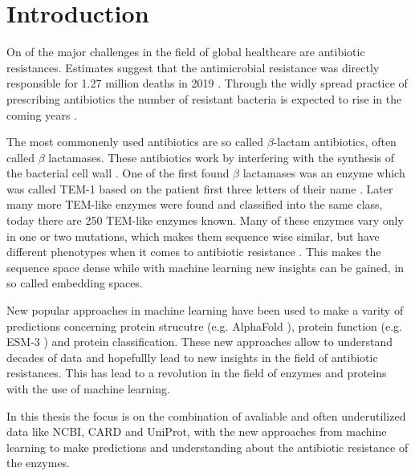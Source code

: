 \chapter{Introduction}

On of the major challenges in the field of global healthcare are antibiotic resistances. Estimates suggest that the antimicrobial resistance was directly responsible for 1.27 million deaths in 2019 \cite{who_antibiotic_resistance}. Through the widly spread practice of prescribing antibiotics the number of resistant bacteria is expected to rise in the coming years \cite{versporten2018}.

The most commonenly used antibiotics are so called $\beta$-lactam antibiotics, often called $\beta$ lactamases. These antibiotics work by interfering with the synthesis of the bacterial cell wall \cite{waxman1980}. One of the first found $\beta$ lactamases was an enzyme which was called TEM-1 based on the patient first three letters of their name \cite{sutcliffe1978}. Later many more TEM-like enzymes were found and classified into the same class, today there are 250 TEM-like enzymes known. Many of these enzymes vary only in one or two mutations, which makes them sequence wise similar, but have different phenotypes when it comes to antibiotic resistance \cite{naas2017}. This makes the sequence space dense while with machine learning new insights can be gained, in so called embedding spaces.

New popular approaches in machine learning have been used to make a varity of predictions concerning protein strucutre (e.g. AlphaFold \cite{jumper2021}), protein function (e.g. ESM-3 \cite{hayes2025}) and protein classification. These new approaches allow to understand decades of data and hopefullly lead to new insights in the field of antibiotic resistances. This has lead to a revolution in the field of enzymes and proteins with the use of machine learning.

In this thesis the focus is on the combination of avaliable and often underutilized data like NCBI, CARD and UniProt, with the new approaches from machine learning to make predictions and understanding about the antibiotic resistance of the enzymes.